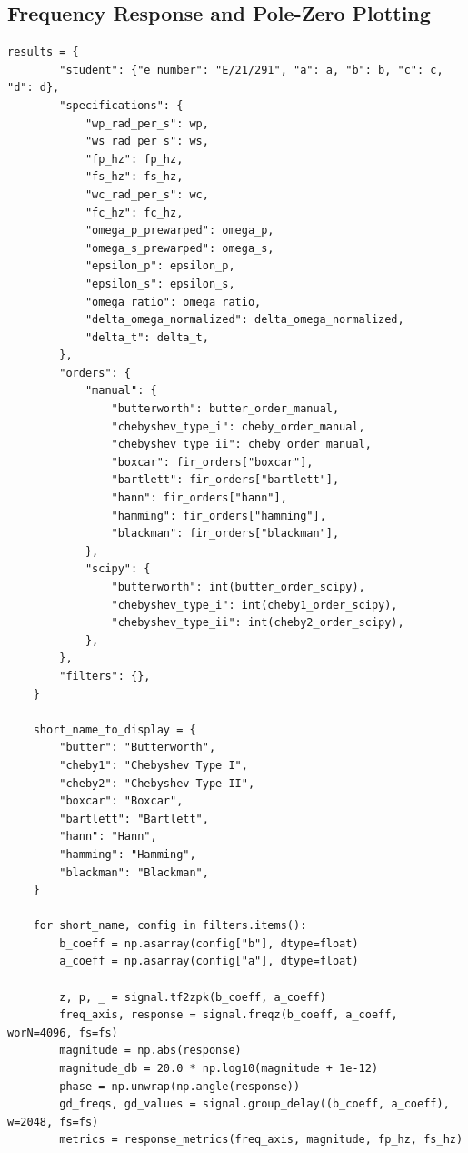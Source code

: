 \documentclass[12pt, a4paper]{article}
\begin{document}
\subsection{Frequency Response and Pole-Zero Plotting}
\begin{lstlisting}[caption={Loop that generates pole-zero, impulse, gain, phase, and group-delay figures.}, label={lst:lab02_plots}]
    results = {
        "student": {"e_number": "E/21/291", "a": a, "b": b, "c": c, "d": d},
        "specifications": {
            "wp_rad_per_s": wp,
            "ws_rad_per_s": ws,
            "fp_hz": fp_hz,
            "fs_hz": fs_hz,
            "wc_rad_per_s": wc,
            "fc_hz": fc_hz,
            "omega_p_prewarped": omega_p,
            "omega_s_prewarped": omega_s,
            "epsilon_p": epsilon_p,
            "epsilon_s": epsilon_s,
            "omega_ratio": omega_ratio,
            "delta_omega_normalized": delta_omega_normalized,
            "delta_t": delta_t,
        },
        "orders": {
            "manual": {
                "butterworth": butter_order_manual,
                "chebyshev_type_i": cheby_order_manual,
                "chebyshev_type_ii": cheby_order_manual,
                "boxcar": fir_orders["boxcar"],
                "bartlett": fir_orders["bartlett"],
                "hann": fir_orders["hann"],
                "hamming": fir_orders["hamming"],
                "blackman": fir_orders["blackman"],
            },
            "scipy": {
                "butterworth": int(butter_order_scipy),
                "chebyshev_type_i": int(cheby1_order_scipy),
                "chebyshev_type_ii": int(cheby2_order_scipy),
            },
        },
        "filters": {},
    }

    short_name_to_display = {
        "butter": "Butterworth",
        "cheby1": "Chebyshev Type I",
        "cheby2": "Chebyshev Type II",
        "boxcar": "Boxcar",
        "bartlett": "Bartlett",
        "hann": "Hann",
        "hamming": "Hamming",
        "blackman": "Blackman",
    }

    for short_name, config in filters.items():
        b_coeff = np.asarray(config["b"], dtype=float)
        a_coeff = np.asarray(config["a"], dtype=float)

        z, p, _ = signal.tf2zpk(b_coeff, a_coeff)
        freq_axis, response = signal.freqz(b_coeff, a_coeff, worN=4096, fs=fs)
        magnitude = np.abs(response)
        magnitude_db = 20.0 * np.log10(magnitude + 1e-12)
        phase = np.unwrap(np.angle(response))
        gd_freqs, gd_values = signal.group_delay((b_coeff, a_coeff), w=2048, fs=fs)
        metrics = response_metrics(freq_axis, magnitude, fp_hz, fs_hz)


\end{lstlisting}
\end{document}
